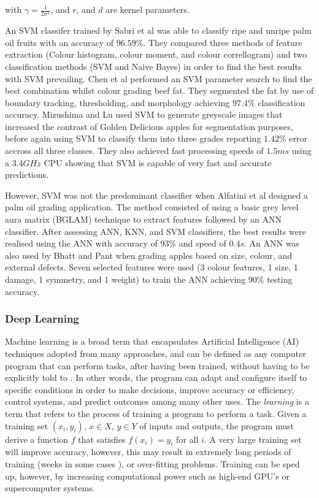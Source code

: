 \documentclass[fleqn,twoside]{article}
\begin{document}
with $\gamma = \frac{1}{2\sigma^2}$, and $r$, and $d$ are kernel parameters. 


An SVM classifer trained by Sabri et al \cite{sabri} was able to classify ripe and unripe palm oil fruits with an accuracy of $96.59\%$. They compared three methods of feature extraction (Colour histogram, colour moment, and colour correllogram) and two classification methods (SVM and Naive Bayes) in order to find the best results with SVM prevailing. Chen et al \cite{chen} performed an SVM parameter search to find the best combination whilst colour grading beef fat. They segmented the fat by use of boundary tracking, thresholding, and morphology achieving $97.4\%$ classification accuracy. Mizushima and Lu \cite{mizushima} used SVM to generate greyscale images that increased the contrast of Golden Delicious apples for segmentation purposes, before again using SVM to classify them into three grades reporting $1.42\%$ error accross all three classes. They also achieved fast processing speeds of $1.5ms$ using a $3.4 GHz$ CPU showing that SVM is capable of very fast and accurate predictions. 

However, SVM was not the predominant classifier when Alfatini et al \cite{alfatni} designed a palm oil grading application. The method consisted of using a basic grey level aura matrix (BGLAM) technique to extract features followed by an ANN classifier. After assessing ANN, KNN, and SVM classifiers, the best results were realised using the ANN with accuracy of $93\%$ and speed of $0.4s$. An ANN was also used by Bhatt and Pant \cite{bhatt} when grading apples based on size, colour, and external defects. Seven selected features were used (3 colour features, 1 size, 1 damage, 1 symmetry, and 1 weight) to train the ANN achieving $90\%$ testing accuracy. 


 


\subsubsection{Deep Learning}

Machine learning is a broad term that encapsulates Artificial Intelligence (AI) techniques adopted from many approaches, and can be defined as any  computer program that can perform tasks, after having been trained,  without having to be explicitly told to \cite{langley,shavlik,mohri}. In other words, the program can adapt and configure itself to specific conditions in order to make decisions, improve accuracy or efficiency, control systems, and predict outcomes among many other uses. The \textit{learning} is a term that refers to the process of training a program to perform a task. Given a training set $(x_i, y_i)$, $x\in X$, $y\in Y$ of inputs and outputs, the program must derive a function $f$ that satisfies $f(x_i) = y_i$ for all $i$. A very large training set will improve accuracy, however, this may result in extremely long periods of training (weeks in some cases \cite{bottou}), or over-fitting problems. Training can be sped up, however, by increasing computational power such as high-end GPU's or supercomputer systems.
\end{document}
